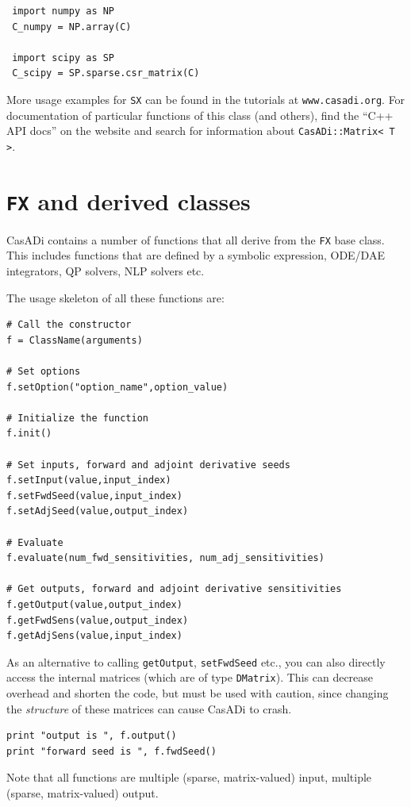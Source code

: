 \documentclass[a4paper,12pt]{book}
\begin{document}
{\begin{verbatim}
 import numpy as NP
 C_numpy = NP.array(C)

 import scipy as SP
 C_scipy = SP.sparse.csr_matrix(C)
\end{verbatim}

More usage examples for \texttt{SX} can be found in the tutorials at \texttt{www.casadi.org}. For documentation of particular functions of this class (and others), find the ``C++ API docs'' on the website and search for information about \texttt{CasADi::Matrix<\,T\,>}.

\section{\texttt{FX} and derived classes}
CasADi contains a number of functions that all derive from the \texttt{FX} base class. This includes functions that are defined by a symbolic expression, ODE/DAE integrators, QP solvers, NLP solvers etc.

The usage skeleton of all these functions are:
\begin{verbatim}
# Call the constructor
f = ClassName(arguments)

# Set options
f.setOption("option_name",option_value)

# Initialize the function
f.init()

# Set inputs, forward and adjoint derivative seeds
f.setInput(value,input_index)
f.setFwdSeed(value,input_index)
f.setAdjSeed(value,output_index)

# Evaluate
f.evaluate(num_fwd_sensitivities, num_adj_sensitivities)

# Get outputs, forward and adjoint derivative sensitivities
f.getOutput(value,output_index)
f.getFwdSens(value,output_index)
f.getAdjSens(value,input_index)
\end{verbatim}

As an alternative to calling \texttt{getOutput}, \texttt{setFwdSeed} etc., you can also directly access the internal matrices (which are of type \texttt{DMatrix}). This can decrease overhead and shorten the code, but must be used with caution, since changing the \emph{structure} of these matrices can cause CasADi to crash.
\begin{verbatim}
print "output is ", f.output()
print "forward seed is ", f.fwdSeed()
\end{verbatim}

Note that all functions are multiple (sparse, matrix-valued) input, multiple (sparse, matrix-valued) output.

}
\end{document}
